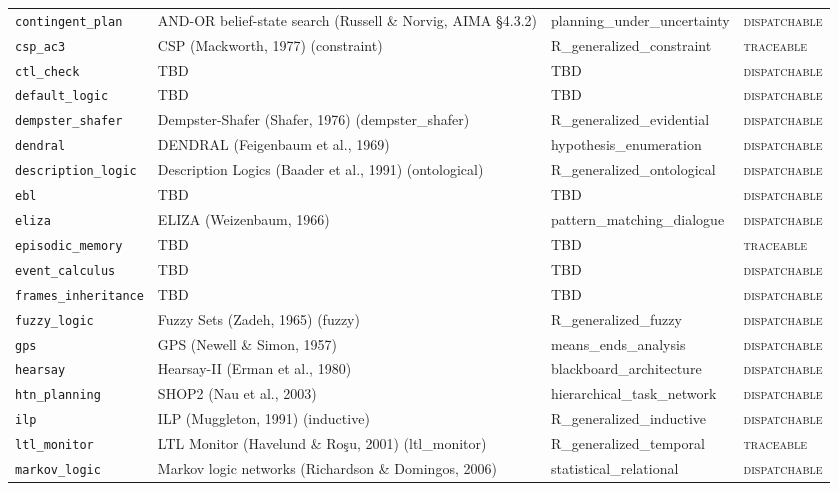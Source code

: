 \documentclass[11pt,oneside]{report}
\begin{document}
\begin{small}
\begin{longtable}{p{3.4cm}p{5.6cm}p{3.4cm}l}
\texttt{contingent\_plan} & AND-OR belief-state search (Russell \& Norvig, AIMA \S4.3.2) & planning\_under\_uncertainty & \textsc{dispatchable} \\
\texttt{csp\_ac3} & CSP (Mackworth, 1977) (constraint) & R\_generalized\_constraint & \textsc{traceable} \\
\texttt{ctl\_check} & TBD & TBD & \textsc{dispatchable} \\
\texttt{default\_logic} & TBD & TBD & \textsc{dispatchable} \\
\texttt{dempster\_shafer} & Dempster-Shafer (Shafer, 1976) (dempster\_shafer) & R\_generalized\_evidential & \textsc{dispatchable} \\
\texttt{dendral} & DENDRAL (Feigenbaum et al., 1969) & hypothesis\_enumeration & \textsc{dispatchable} \\
\texttt{description\_logic} & Description Logics (Baader et al., 1991) (ontological) & R\_generalized\_ontological & \textsc{dispatchable} \\
\texttt{ebl} & TBD & TBD & \textsc{dispatchable} \\
\texttt{eliza} & ELIZA (Weizenbaum, 1966) & pattern\_matching\_dialogue & \textsc{dispatchable} \\
\texttt{episodic\_memory} & TBD & TBD & \textsc{traceable} \\
\texttt{event\_calculus} & TBD & TBD & \textsc{dispatchable} \\
\texttt{frames\_inheritance} & TBD & TBD & \textsc{dispatchable} \\
\texttt{fuzzy\_logic} & Fuzzy Sets (Zadeh, 1965) (fuzzy) & R\_generalized\_fuzzy & \textsc{dispatchable} \\
\texttt{gps} & GPS (Newell \& Simon, 1957) & means\_ends\_analysis & \textsc{dispatchable} \\
\texttt{hearsay} & Hearsay-II (Erman et al., 1980) & blackboard\_architecture & \textsc{dispatchable} \\
\texttt{htn\_planning} & SHOP2 (Nau et al., 2003) & hierarchical\_task\_network & \textsc{dispatchable} \\
\texttt{ilp} & ILP (Muggleton, 1991) (inductive) & R\_generalized\_inductive & \textsc{dispatchable} \\
\texttt{ltl\_monitor} & LTL Monitor (Havelund \& Ro\c{s}u, 2001) (ltl\_monitor) & R\_generalized\_temporal & \textsc{traceable} \\
\texttt{markov\_logic} & Markov logic networks (Richardson \& Domingos, 2006) & statistical\_relational & \textsc{dispatchable} \\

\end{longtable}
\end{small}
\end{document}
